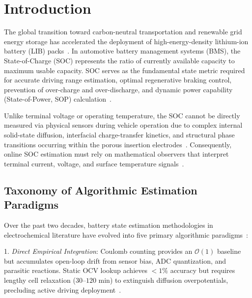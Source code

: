 \documentclass[balance,nocopyright,upint,varvw,hyphenate,barcolor=NavyBlue,nolists]{asmejour}
\begin{document}
\section{Introduction}

The global transition toward carbon-neutral transportation and renewable grid energy storage has accelerated the deployment of high-energy-density lithium-ion battery (LIB) packs~\cite{Tarascon2001,Lu2013review,Mukherjee2024}. In automotive battery management systems (BMS), the State-of-Charge (SOC) represents the ratio of currently available capacity to maximum usable capacity. SOC serves as the fundamental state metric required for accurate driving range estimation, optimal regenerative braking control, prevention of over-charge and over-discharge, and dynamic power capability (State-of-Power, SOP) calculation~\cite{Plett2004part1,Xiong2018joint,Farmann2016peukert}. 

Unlike terminal voltage or operating temperature, the SOC cannot be directly measured via physical sensors during vehicle operation due to complex internal solid-state diffusion, interfacial charge-transfer kinetics, and structural phase transitions occurring within the porous insertion electrodes~\cite{Doyle1993,Torchio2016pybam}. Consequently, online SOC estimation must rely on mathematical observers that interpret terminal current, voltage, and surface temperature signals~\cite{Plett2004part2,Hu2012ecm,Ren2019aging}.

\subsection{Taxonomy of Algorithmic Estimation Paradigms}
Over the past two decades, battery state estimation methodologies in electrochemical literature have evolved into five primary algorithmic paradigms~\cite{Xiong2018joint,Hannan2021review}:

1. \emph{Direct Empirical Integration}: Coulomb counting provides an $\mathcal{O}(1)$ baseline~\cite{Plett2004part1} but accumulates open-loop drift from sensor bias, ADC quantization, and parasitic reactions. Static OCV lookup achieves $<1\%$ accuracy but requires lengthy cell relaxation ($30\text{--}120\text{ min}$) to extinguish diffusion overpotentials, precluding active driving deployment~\cite{Roscher2011hysteresis,Verbrugge2004hysteresis}.
\end{document}
